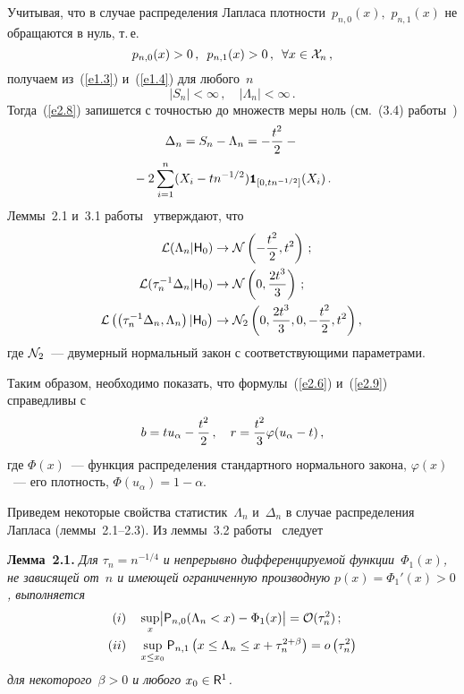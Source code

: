 \begin{multicols}{2}
Учитывая, что в случае распределения Лапласа плотности~$p_{n,0}(x),$ $p_{n,1}(x)$ не обращаются в нуль, т.\,е.\
\begin{equation}
p_{n,0}(x)>0\,,\enskip p_{n,1}(x)>0\,,\enskip \forall x\in{\cal{X}}_n\,,
\label{e2.10}
\end{equation}
получаем из~(\ref{e1.3}) и~(\ref{e1.4}) для любого~$n$
$$
\left|S_n\right|<\infty\,,\quad  \left|\Lambda_n\right| <\infty\,.
$$
Тогда~(\ref{e2.8}) запишется с точностью до множеств меры ноль (см.~(3.4) работы~\cite{3ben})
\begin{multline*}
\Delta_n=S_n-\Lambda_n=-\displaystyle\frac{\displaystyle t^2\mathstrut}{\displaystyle 2\mathstrut}-{}\\
{}-2\sum_{i=1}^{n}(X_i-tn^{-1/2}){\mbox{{\small \tt {1}}\hspace{-1.5mm}{\tt 1}}}_{[0,tn^{-1/2}]}(X_i)\,.
\end{multline*}
Леммы~2.1 и~3.1 работы~\cite{3ben} утверждают, что
\begin{align}
{\cal L}(\Lambda_n \vert {\sf H}_0) &\to
{\cal N}\left(-\displaystyle\frac{\displaystyle t^2\mathstrut}{\displaystyle 2\mathstrut}, t^2 \right)\,;
\label{e2.12}\\
{\cal L}(\tau_n^{-1} \Delta_n\vert{\sf H}_0) & \to 
{\cal N}\left(0, \displaystyle\frac{\displaystyle 2t^3\mathstrut}{\displaystyle 3\mathstrut} \right)\,;\notag
\\
\!\!\!{\cal L}\left(\left(\tau_n^{-1} \Delta_n,\Lambda_n\right)\vert {\sf H}_0\right) & \to 
{\cal N}_2 \left(0, \displaystyle\frac{\displaystyle 2t^3\mathstrut}{\displaystyle 3\mathstrut},0, -\displaystyle\frac{\displaystyle t^2\mathstrut}{\displaystyle 2\mathstrut}, t^2\right),\!\!
\label{e2.14}
\end{align}
где ${\cal N}_2$~--- двумерный нормальный закон с соответствующими
параметрами.

Таким образом, необходимо показать, что формулы~(\ref{e2.6}) и~(\ref{e2.9}) справедливы с
$$
b=tu_{\alpha}-\displaystyle\frac{\displaystyle t^2\mathstrut}{\displaystyle 2\mathstrut}\,,\quad  r=\displaystyle\frac{\displaystyle t^2\mathstrut}{\displaystyle 3\mathstrut}\varphi(u_{\alpha}-t)\,,
$$
где $\Phi(x)$~--- функция распределения стандартного нормального закона, $\varphi(x)$~--- его плотность, 
$\Phi(u_{\alpha})=1-\alpha$.

Приведем некоторые свойства статистик~$\Lambda_n$ и~$\Delta_n$ в случае распределения 
Лапласа (леммы~2.1--2.3). Из леммы~3.2 работы~\cite{4ben} следует

\smallskip

\noindent
\textbf{Лемма~2.1.} {\it Для $\tau_n=n^{-1/4}$ и непрерывно дифференцируемой функции~$\Phi_1(x)$, не зависящей от~$n$ 
и имеющей ограниченную производную $p(x)=\Phi_1'(x)>0$, выполняется
\begin{align*}
(i) \ \ \ &
\sup\limits_{x}\bigl|{{\sf P}}_{n,0}(\Lambda_n < x) - \Phi_1(x) \bigr|={\cal O}(\tau_n^2)\,;\\
(ii) \ \ \ &
\sup\limits_{x\leq x_0}{{\sf P}}_{n,1}\left(x\leq \Lambda_n \leq x + \tau_n^{2+\beta} \right)=o\left(\tau_n^2\right)
\end{align*}
для некоторого~$\beta>0$ и любого $x_0\in{\sf R}^1$.
}


\end{multicols}
